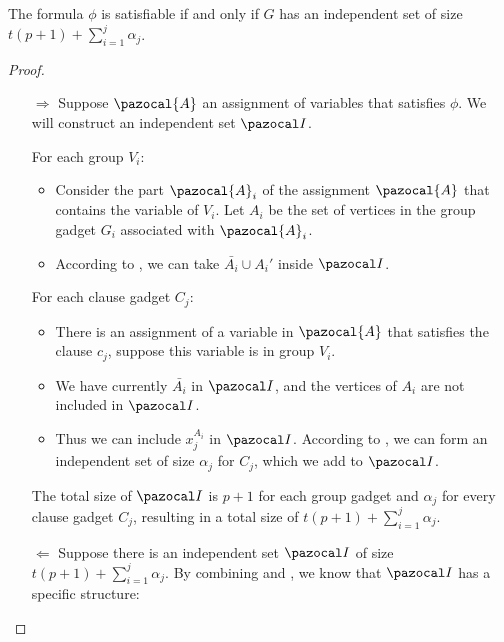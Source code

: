 

\begin{lemma}
    \label{lemma:indset-sat-graph-equiv}
    The formula $\phi$ is satisfiable if and only if $G$ has an independent set of size $t(p+1) + \sum_{i = 1}^j \alpha_j$.
\end{lemma}

\begin{proof}
    \begin{itemize}
        \item [$\Rightarrow$] Suppose $\pazocal{A}$ an assignment of variables that satisfies $\phi$. We will construct an independent set $\I$.
        
        For each group $V_i$:
        \begin{itemize}
            \item Consider the part $\pazocal{A}_i$ of the assignment $\pazocal{A}$ that contains the variable of $V_i$. Let $A_i$ be the set of vertices in the group gadget $G_i$ associated with $\pazocal{A}_i$.
            \item According to , we can take $\bar{A_i} \cup A_i'$ inside $\I$.
        \end{itemize}
        For each clause gadget $C_j$:
        \begin{itemize}
            \item There is an assignment of a variable in $\pazocal{A}$ that satisfies the clause $c_j$, suppose this variable is in group $V_i$.
            \item We have currently $\bar{A_i}$ in $\I$, and the vertices of $A_i$ are not included in $\I$.
            \item Thus we can include $x_j^{A_i}$ in $\I$. According to , we can form an independent set of size $\alpha_j$ for $C_j$, which we add to $\I$.
        \end{itemize}
        
        \medskip

        The total size of $\I$ is $p+1$ for each group gadget and $\alpha_j$ for every clause gadget $C_j$, resulting in a total size of $t(p+1) + \sum_{i = 1}^j \alpha_j$.

        \item [$\Leftarrow$] Suppose there is an independent set $\I$ of size $t(p+1) + \sum_{i = 1}^j \alpha_j$. By combining  and , we know that $\I$ has a specific structure:
        

\end{itemize}
\end{proof}
